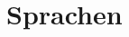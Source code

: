 \newcommand{\keyword}[1]{{\bf #1}}
\newcommand{\jasscode}[1]{{\bf #1}}
\newcommand{\jassppcode}[1]{{\bf #1}}
\newcommand{\notation}[1]{{\bf #1}}

\chapter{Sprachen}

 
